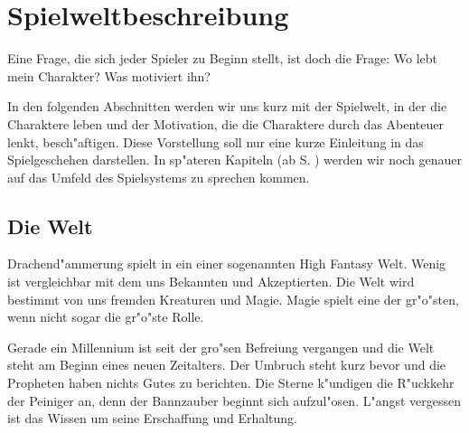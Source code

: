 \chapter{Spielweltbeschreibung}
\label{spielweltbeschreibung}
\par Eine Frage, die sich jeder Spieler zu Beginn stellt, ist doch die Frage: \glqq Wo lebt mein Charakter? 
Was motiviert ihn?\grqq
\par In den folgenden Abschnitten werden wir uns kurz mit der Spielwelt, in der die 
Charaktere leben und der Motivation, die die Charaktere durch das Abenteuer 
lenkt, besch"aftigen. Diese Vorstellung soll nur eine kurze Einleitung in das Spielgeschehen 
darstellen. In sp"ateren Kapiteln (ab S. \pageref{diewelteinleitung}) werden wir noch genauer auf das Umfeld des 
Spielsystems zu sprechen kommen.

\section{Die Welt}
\par Drachend"ammerung spielt in ein einer sogenannten High Fantasy Welt. Wenig ist vergleichbar mit dem uns 
Bekannten und Akzeptierten. Die Welt wird bestimmt von uns fremden Kreaturen und Magie. Magie spielt eine der 
gr"o"sten, wenn nicht sogar die gr"o"ste Rolle.
\par Gerade ein Millennium ist seit der gro"sen Befreiung vergangen und die Welt steht am Beginn eines neuen 
Zeitalters. Der Umbruch steht kurz bevor und die Propheten haben nichts Gutes zu berichten. Die Sterne k"undigen 
die R"uckkehr der Peiniger an, denn der Bannzauber beginnt sich aufzul"osen. L"angst vergessen ist das Wissen um 
seine Erschaffung und Erhaltung.

